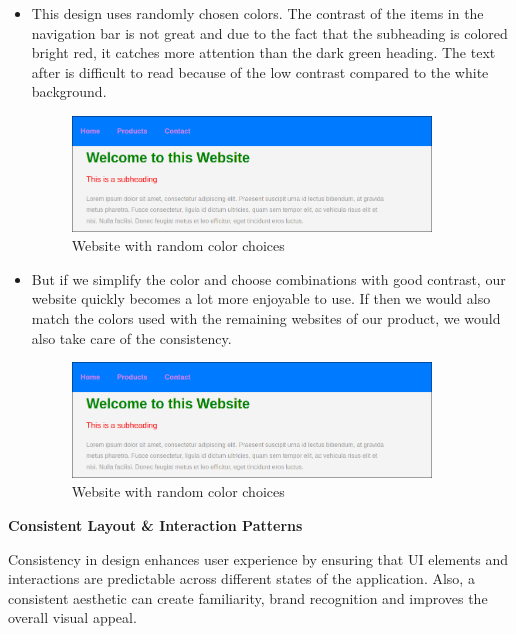 \begin{itemize}
    \item {
    This design uses randomly chosen colors. The contrast of the items in the navigation bar is not great and due to the fact that the subheading is colored bright red, it catches more attention than the dark green heading. The text after is difficult to read because of the low contrast compared to the white background.
    
    \begin{figure} [H]
        \center
        \includegraphics [width=0.9\textwidth] {images/paul/usabilityExamples/badColor.png}
        \caption{Website with random color choices}
    \end{figure}}
    
    
    \item {
    But if we simplify the color and choose combinations with good contrast, our website quickly becomes a lot more enjoyable to use. If then we would also match the colors used with the remaining websites of our product, we would also take care of the consistency.

    \begin{figure} [H]
        \center
        \includegraphics [width=0.9\textwidth] {images/paul/usabilityExamples/badColor.png}
        \caption{Website with random color choices}
    \end{figure}}
\end{itemize}

\autocite [vgl.]{Paul:ColorTheoryForBeginners}

\blankLine

\textbf{Consistent Layout \& Interaction Patterns}

Consistency in design enhances user experience by ensuring that UI elements and interactions are predictable across different states of the application. Also, a consistent aesthetic can create familiarity, brand recognition and improves the overall visual appeal. 

